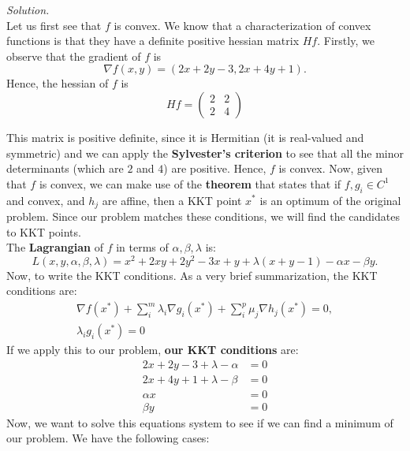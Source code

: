 \documentclass[a4paper]{article}
\newenvironment{solution}
    {\textit{Solution.}\\}
    {}
\begin{document}
\begin{solution}
  Let us first see that \(f\) is convex. We know that a characterization of convex functions is that they have a definite positive hessian matrix \(Hf\). Firstly, we observe that the gradient of \(f\) is
  \[
    \nabla f(x,y) = \left( 2x + 2y - 3, 2x + 4y + 1\right).
  \]
  Hence, the hessian of \(f\) is
  \[
    Hf = \begin{pmatrix} 2 & 2 \\ 2 & 4 \end{pmatrix}
  \]

  This matrix is positive definite, since it is Hermitian (it is real-valued and symmetric) and we can apply the \textbf{Sylvester's criterion} to see that all the minor determinants (which are \(2\) and \(4\)) are positive. Hence, \(f\) is convex. Now, given that \(f\) is convex, we can make use of the \textbf{theorem} that states that if \(f,g_{i} \in C^{1}\) and convex, and \(h_{j}\) are affine, then a KKT point \(x^{*}\) is an optimum of the original problem. Since our problem matches these conditions, we will find the candidates to KKT points.\\

  The \textbf{Lagrangian} of \(f\) in terms of \(\alpha,\beta,\lambda\) is:
  \[
    L(x,y,\alpha,\beta,\lambda) = x^{2} + 2xy + 2y^{2} - 3x + y + \lambda(x+y - 1) - \alpha x - \beta y .
  \]
  Now, to write the KKT conditions. As a very brief summarization, the KKT conditions are:
  \begin{align*}
    \nabla f(x^{*}) + \sum_{i}^m\lambda_{i} \nabla g_{i}(x^*) + \sum_{i}^p\mu_{j} \nabla h_{j}(x^*) = 0, \\
    \lambda_{i}g_{i}(x^*) = 0
  \end{align*}
  If we apply this to our problem, \textbf{our KKT conditions} are:
  \begin{align*}
    2x + 2y - 3 + \lambda - \alpha & = 0 \\
    2x + 4y + 1 +  \lambda - \beta & = 0 \\
    \alpha x                       & = 0 \\
    \beta y                        & = 0
  \end{align*}
  Now, we want to solve this equations system to see if we can find a minimum of our problem. We have the following cases:


\end{solution}
\end{document}
